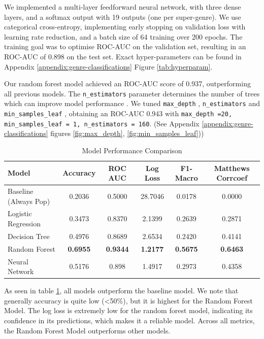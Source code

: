 \documentclass{article}
\begin{document}
We implemented a multi-layer feedforward neural network, with three dense layers, and a softmax output with 19 outputs (one per super-genre). We use categorical cross-entropy, implementing early stopping on validation loss with learning rate reduction, and a batch size of 64 training over 200 epochs. The training goal was to optimise ROC-AUC on the validation set, resulting in an ROC-AUC of 0.898 on the test set. Exact hyper-parameters can be found in Appendix \ref{appendix:genre-classifications} Figure \ref{tab:hyperparam}.

Our random forest model achieved an ROC-AUC score of 0.937, outperforming all previous models. The \texttt{n\_estimators} parameter determines the number of trees which can improve model performance \cite{Shafi_2025}. We tuned \texttt{max\_depth} , \texttt{n\_estimators} and \texttt{min\_samples\_leaf} , obtaining an ROC-AUC 0.943 with \texttt{max\_depth =20, min\_samples\_leaf = 1, n\_estimators = 160}. (See Appendix \ref{appendix:genre-classifications} figures \ref{fig:max_depth}, \ref{fig:min_samples_leaf}))



\begin{table}[h]
\centering
\caption{Model Performance Comparison}
\label{tab:model_comparison}
\begin{tabular}{lccccc}
\hline
\textbf{Model} & \textbf{Accuracy} & \textbf{ROC AUC} & \textbf{Log Loss} & \textbf{F1-Macro} & \textbf{Matthews Corrcoef} \\
\hline
Baseline (Always Pop) & 0.2036 & 0.5000 & 28.7046 & 0.0178 & 0.0000 \\
Logistic Regression & 0.3473 & 0.8370 & 2.1399 & 0.2639 & 0.2871 \\
Decision Tree & 0.4976 & 0.8689 & 2.6534 & 0.2420 & 0.4141 \\
Random Forest & \textbf{0.6955} & \textbf{0.9344} & \textbf{1.2177} & \textbf{0.5675} & \textbf{0.6463} \\
Neural Network & 0.5176 & 0.898 & 1.4917 & 0.2973 & 0.4358 \\
\hline
\end{tabular}
\end{table}

As seen in table \ref{tab:model_comparison}, all models outperform the baseline model. We note that generally accuracy is quite low (<50\%), but it is highest for the Random Forest Model. The log loss is extremely low for the random forest model, indicating its confidence in its predictions, which makes it a reliable model. Across all metrics, the Random Forest Model outperforms other models.
\end{document}
